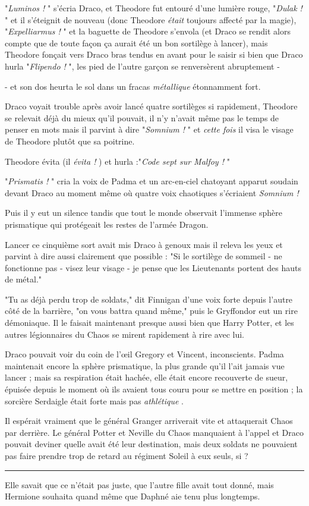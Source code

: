 "\emph{Luminos !} " s'écria Draco, et Theodore fut entouré d'une lumière rouge, "\emph{Dulak !} " et il s'éteignit de nouveau (donc Theodore \emph{était}  toujours affecté par la magie), "\emph{Expelliarmus !} " et la baguette de Theodore s'envola (et Draco se rendit alors compte que de toute façon ça aurait été un bon sortilège à lancer), mais Theodore fonçait vers Draco bras tendus en avant pour le saisir si bien que Draco hurla "\emph{Flipendo !} ", les pied de l'autre garçon se renversèrent abruptement -

- et son dos heurta le sol dans un fracas \emph{métallique}  étonnamment fort.

Draco voyait trouble après avoir lancé quatre sortilèges si rapidement, Theodore se relevait déjà du mieux qu'il pouvait, il n'y n'avait même pas le temps de penser en mots mais il parvint à dire "\emph{Somnium !} " et \emph{cette fois}  il visa le visage de Theodore plutôt que sa poitrine.

Theodore évita (il \emph{évita !} ) et hurla :"\emph{Code sept sur Malfoy !} "

"\emph{Prismatis !} " cria la voix de Padma et un arc-en-ciel chatoyant apparut soudain devant Draco au moment même où quatre voix chaotiques s'écriaient \emph{Somnium !} 

Puis il y eut un silence tandis que tout le monde observait l'immense sphère prismatique qui protégeait les restes de l'armée Dragon.

Lancer ce cinquième sort avait mis Draco à genoux mais il releva les yeux et parvint à dire aussi clairement que possible : "Si le sortilège de sommeil - ne fonctionne pas - visez leur visage - je pense que les Lieutenants portent des hauts de métal."

"Tu as déjà perdu trop de soldats," dit Finnigan d'une voix forte depuis l'autre côté de la barrière, "on vous battra quand même," puis le Gryffondor eut un rire démoniaque. Il le faisait maintenant presque aussi bien que Harry Potter, et les autres légionnaires du Chaos se mirent rapidement à rire avec lui.

Draco pouvait voir du coin de l'œil Gregory et Vincent, inconscients. Padma maintenait encore la sphère prismatique, la plus grande qu'il l'ait jamais vue lancer ; mais sa respiration était hachée, elle était encore recouverte de sueur, épuisée depuis le moment où ils avaient tous couru pour se mettre en position ; la sorcière Serdaigle était forte mais pas \emph{athlétique} .

Il espérait vraiment que le général Granger arriverait vite et attaquerait Chaos par derrière. Le général Potter et Neville du Chaos manquaient à l'appel et Draco pouvait deviner quelle avait été leur destination, mais deux soldats ne pouvaient pas faire prendre trop de retard au régiment Soleil à eux seuls, si ?
\par\noindent\rule{\textwidth}{0.4pt}
Elle savait que ce n'était pas juste, que l'autre fille avait tout donné, mais Hermione souhaita quand même que Daphné aie tenu plus longtemps.

